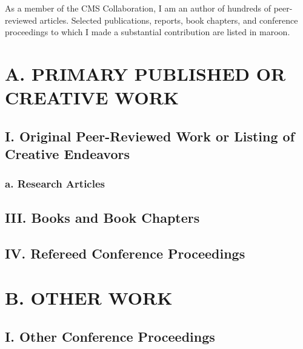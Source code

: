 \documentclass{res}
\newcommand{\MarginText}[1]{\section{#1}\vspace{10pt}}
\begin{document}

\address{}
\address{}

\newcommand{\DOI}[1]{\href{https://doi.org/#1}{doi:#1}}
\begin{resume}


  As a member of the CMS Collaboration, I am an author of hundreds of peer-reviewed articles.
  Selected publications, reports, book chapters, and conference proceedings to which I made a substantial contribution are listed in {\color{Maroon}maroon}.

  \MarginText{A. PRIMARY PUBLISHED OR CREATIVE WORK}
  \subsection{I. Original Peer-Reviewed Work or Listing of Creative Endeavors}
  \subsubsection{a. Research Articles}
  \nocite{*}
  \vspace{10pt}
  \printbibliography[heading=none]

  \subsection{III. Books and Book Chapters}
  \nocite{*}
  \vspace{10pt}
  \printbibliography[heading=none]

  \subsection{IV. Refereed Conference Proceedings}
  \nocite{*}
  \vspace{10pt}
  \printbibliography[heading=none]

  \MarginText{B. OTHER WORK}
  \subsection{I. Other Conference Proceedings}
  \nocite{*}
  \vspace{10pt}
  \printbibliography[heading=none]


\end{resume}
\end{document}
